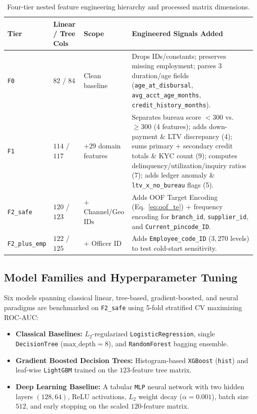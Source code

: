 \begin{table}[htbp]
  \centering
  \caption{Four-tier nested feature engineering hierarchy and processed matrix dimensions.}
  \label{tab:features}
  \footnotesize
  \begin{tabularx}{\textwidth}{@{}llL{3.0cm}Y@{}}
    \toprule
    \textbf{Tier} & \textbf{Linear / Tree Cols} & \textbf{Scope} & \textbf{Engineered Signals Added} \\
    \midrule
    \texttt{F0} & $82$ / $84$ & Clean baseline & Drops IDs/constants; preserves missing employment; parses 3 duration/age fields (\texttt{age\_at\_disbursal}, \texttt{avg\_acct\_age\_months}, \texttt{credit\_history\_months}). \\[3pt]
    \texttt{F1} & $114$ / $117$ & $+29$ domain features & Separates bureau score $<300$ vs.\ $\ge 300$ (4 features); adds down-payment \& LTV discrepancy (4); sums primary + secondary credit totals \& KYC count (9); computes delinquency/utilization/inquiry ratios (7); adds ledger anomaly \& \texttt{ltv\_x\_no\_bureau} flags (5). \\[3pt]
    \texttt{F2\_safe} & $120$ / $123$ & $+$ Channel/Geo IDs & Adds OOF Target Encoding (Eq.~\eqref{eq:oof_te}) + frequency encoding for \texttt{branch\_id}, \texttt{supplier\_id}, and \texttt{Current\_pincode\_ID}. \\[3pt]
    \texttt{F2\_plus\_emp} & $122$ / $125$ & $+$ Officer ID & Adds \texttt{Employee\_code\_ID} ($3{,}270$ levels) to test cold-start sensitivity. \\
    \bottomrule
  \end{tabularx}
\end{table}

\subsection{Model Families and Hyperparameter Tuning}
Six models spanning classical linear, tree-based, gradient-boosted, and neural paradigms are benchmarked on \texttt{F2\_safe} using 5-fold stratified CV maximizing ROC-AUC:
\begin{itemize}
  \item \textbf{Classical Baselines:} $L_2$-regularized \texttt{LogisticRegression}, single \texttt{DecisionTree} ($\text{max\_depth}=8$), and \texttt{RandomForest} bagging ensemble.
  \item \textbf{Gradient Boosted Decision Trees:} Histogram-based \texttt{XGBoost} (\texttt{hist}) and leaf-wise \texttt{LightGBM} trained on the $123$-feature tree matrix.
  \item \textbf{Deep Learning Baseline:} A tabular \texttt{MLP} neural network with two hidden layers $(128, 64)$, ReLU activations, $L_2$ weight decay ($\alpha = 0.001$), batch size $512$, and early stopping on the scaled $120$-feature matrix.
\end{itemize}

